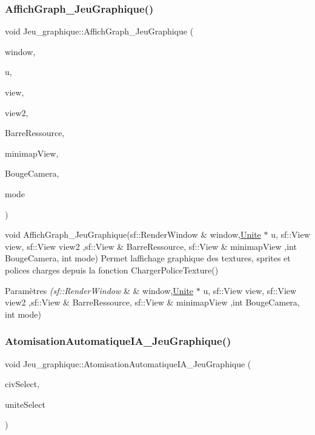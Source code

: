 \subsubsection{\texorpdfstring{Affich\+Graph\+\_\+\+Jeu\+Graphique()}{AffichGraph\_JeuGraphique()}}
{\footnotesize\ttfamily void Jeu\+\_\+graphique\+::\+Affich\+Graph\+\_\+\+Jeu\+Graphique (\begin{DoxyParamCaption}\item[{sf\+::\+Render\+Window \&}]{window,  }\item[{\hyperlink{classUnite}{Unite} $\ast$}]{u,  }\item[{sf\+::\+View}]{view,  }\item[{sf\+::\+View}]{view2,  }\item[{sf\+::\+View \&}]{Barre\+Ressource,  }\item[{sf\+::\+View \&}]{minimap\+View,  }\item[{int}]{Bouge\+Camera,  }\item[{int}]{mode }\end{DoxyParamCaption})}



void Affich\+Graph\+\_\+\+Jeu\+Graphique(sf\+::\+Render\+Window \& window,\hyperlink{classUnite}{Unite} $\ast$ u, sf\+::\+View view, sf\+::\+View view2 ,sf\+::\+View \& Barre\+Ressource, sf\+::\+View \& minimap\+View ,int Bouge\+Camera, int mode) Permet l\textquotesingle{}affichage graphique des textures, sprites et polices charges depuis la fonction Charger\+Police\+Texture() 


\begin{DoxyParams}{Paramètres}
{\em (sf\+::\+Render\+Window} & \& window,\hyperlink{classUnite}{Unite} $\ast$ u, sf\+::\+View view, sf\+::\+View view2 ,sf\+::\+View \& Barre\+Ressource, sf\+::\+View \& minimap\+View ,int Bouge\+Camera, int mode) \\
\hline
\end{DoxyParams}
\mbox{\label{classJeu__graphique_af4ade29c26e98e7bb22ed47577daaba2}} 
\subsubsection{\texorpdfstring{Atomisation\+Automatique\+I\+A\+\_\+\+Jeu\+Graphique()}{AtomisationAutomatiqueIA\_JeuGraphique()}}
{\footnotesize\ttfamily void Jeu\+\_\+graphique\+::\+Atomisation\+Automatique\+I\+A\+\_\+\+Jeu\+Graphique (\begin{DoxyParamCaption}\item[{int}]{civ\+Select,  }\item[{int}]{unite\+Select }\end{DoxyParamCaption})}



